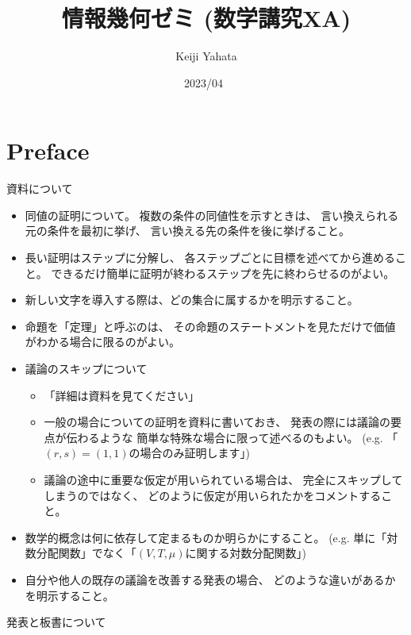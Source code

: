\documentclass[report, notitlepage]{jlreq}
\title{情報幾何ゼミ (数学講究XA)}
\author{Keiji Yahata}
\date{2023/04~}
\begin{document}
\maketitle

\chapter*{Preface}

資料について

\begin{itemize}
    \item 同値の証明について。
        複数の条件の同値性を示すときは、
        言い換えられる元の条件を最初に挙げ、
        言い換える先の条件を後に挙げること。
    \item 長い証明はステップに分解し、
        各ステップごとに目標を述べてから進めること。
        できるだけ簡単に証明が終わるステップを先に終わらせるのがよい。
    \item 新しい文字を導入する際は、どの集合に属するかを明示すること。
    \item 命題を「定理」と呼ぶのは、
        その命題のステートメントを見ただけで価値がわかる場合に限るのがよい。
    \item 議論のスキップについて
        \begin{itemize}
            \item 「詳細は資料を見てください」
            \item 一般の場合についての証明を資料に書いておき、
                発表の際には議論の要点が伝わるような
                簡単な特殊な場合に限って述べるのもよい。
                (e.g. 「$(r, s) = (1, 1)$の場合のみ証明します」)
            \item 議論の途中に重要な仮定が用いられている場合は、
                完全にスキップしてしまうのではなく、
                どのように仮定が用いられたかをコメントすること。
        \end{itemize}
    \item 数学的概念は何に依存して定まるものか明らかにすること。
        (e.g. 単に「対数分配関数」でなく「$(V, T, \mu)$に関する対数分配関数」)
    \item 自分や他人の既存の議論を改善する発表の場合、
        どのような違いがあるかを明示すること。
\end{itemize}

発表と板書について
\end{document}
